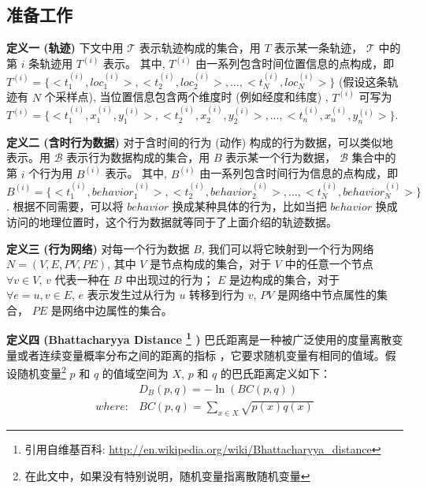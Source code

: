 \subsection{准备工作}
\textbf{定义一 \hspace{1mm} (轨迹)} 下文中用 $\mathcal{T}$ 表示轨迹构成的集合，用 $T$ 表示某一条轨迹， $\mathcal{T}$ 中的第 $i$ 条轨迹用 $T^{(i)}$ 表示。 其中, $T^{(i)}$ 由一系列包含时间位置信息的点构成，即 $T^{(i)} = \{<t^{(i)}_1,loc^{(i)}_1>,<t^{(i)}_2,loc^{(i)}_2>,\ldots,<t^{(i)}_N,loc^{(i)}_N> \}$ (假设这条轨迹有 $N$ 个采样点), 当位置信息包含两个维度时 (例如经度和纬度) , $T^{(i)}$ 可写为 $T^{(i)} = \{<t^{(i)}_1,x^{(i)}_1,y^{(i)}_1>,<t^{(i)}_2,x^{(i)}_2,y^{(i)}_2>,\ldots,<t^{(i)}_n,x^{(i)}_n,y^{(i)}_n> \}$. \par
\vspace{2mm}
\textbf{定义二 \hspace{1mm} (含时行为数据)} 对于含时间的行为 (动作) 构成的行为数据，可以类似地表示。用 $\mathcal{B}$ 表示行为数据构成的集合，用 $B$ 表示某一个行为数据， $\mathcal{B}$ 集合中的第 $i$ 个行为用 $B^{(i)}$ 表示。 其中, $B^{(i)}$ 由一系列包含时间行为信息的点构成，即 $B^{(i)} = \{<t^{(i)}_1,behavior^{(i)}_1>,<t^{(i)}_2,behavior^{(i)}_2>,\ldots,<t^{(i)}_N,behavior^{(i)}_N> \}$. 根据不同需要，可以将 $behavior$ 换成某种具体的行为，比如当把 $behavior$ 换成访问的地理位置时，这个行为数据就等同于了上面介绍的轨迹数据。 \par
\vspace{2mm}
\textbf{定义三 \hspace{1mm} (行为网络)} 对每一个行为数据 $B$, 我们可以将它映射到一个行为网络 $N=(V,E,PV,PE)$, 其中 $V$ 是节点构成的集合，对于 $V$ 中的任意一个节点 $\forall v \in V$, $v$ 代表一种在 $B$ 中出现过的行为； $E$ 是边构成的集合，对于 $\forall e = {u,v} \in E$, $e$ 表示发生过从行为 $u$ 转移到行为 $v$, $PV$ 是网络中节点属性的集合， $PE$ 是网络中边属性的集合。\par
\vspace{2mm}
\textbf{定义四 \hspace{1mm} (Bhattacharyya Distance \footnote{引用自维基百科: \url{http://en.wikipedia.org/wiki/Bhattacharyya_distance}} )} 巴氏距离是一种被广泛使用的度量离散变量或者连续变量概率分布之间的距离的指标  ，它要求随机变量有相同的值域。假设随机变量\footnote{在此文中，如果没有特别说明，随机变量指离散随机变量} $p$ 和 $q$ 的值域空间为 $X$, $p$ 和 $q$ 的巴氏距离定义如下：
\begin{equation}
\label{BhattacharyyaDis}
\begin{split}
&D_B(p,q) = - \ln(BC(p,q))\\ 
where: &BC(p,q) = \sum_{x \in X} \sqrt{p(x)q(x)}
\end{split}
\end{equation}
